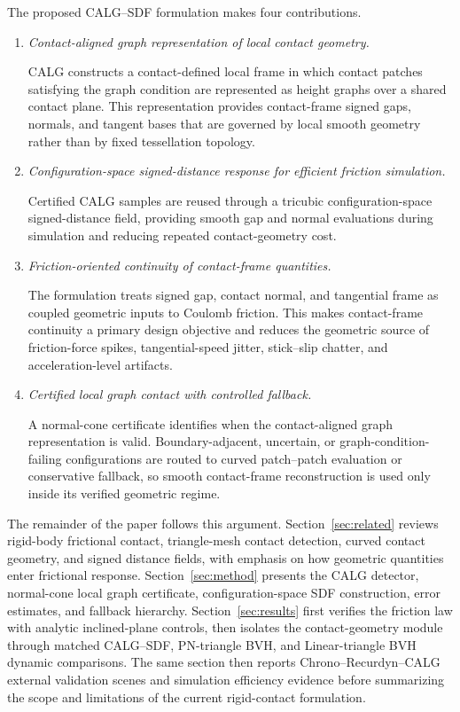 \documentclass[preprint,12pt]{elsarticle}
\newcommand{\calg}{\textsc{CALG}}
\begin{document}
The proposed \calg{}--SDF formulation makes four contributions.
\begin{enumerate}[leftmargin=*,label=(\roman*)]
    \item \emph{Contact-aligned graph representation of local contact geometry.}
    \par \calg{} constructs a contact-defined local frame in which contact patches satisfying the graph condition are represented as height graphs over a shared contact plane. This representation provides contact-frame signed gaps, normals, and tangent bases that are governed by local smooth geometry rather than by fixed tessellation topology.
    \item \emph{Configuration-space signed-distance response for efficient friction simulation.}
    \par Certified \calg{} samples are reused through a tricubic configuration-space signed-distance field, providing smooth gap and normal evaluations during simulation and reducing repeated contact-geometry cost.
    \item \emph{Friction-oriented continuity of contact-frame quantities.}
    \par The formulation treats signed gap, contact normal, and tangential frame as coupled geometric inputs to Coulomb friction. This makes contact-frame continuity a primary design objective and reduces the geometric source of friction-force spikes, tangential-speed jitter, stick--slip chatter, and acceleration-level artifacts.
    \item \emph{Certified local graph contact with controlled fallback.}
    \par A normal-cone certificate identifies when the contact-aligned graph representation is valid. Boundary-adjacent, uncertain, or graph-condition-failing configurations are routed to curved patch--patch evaluation or conservative fallback, so smooth contact-frame reconstruction is used only inside its verified geometric regime.
\end{enumerate}

The remainder of the paper follows this argument. Section~\ref{sec:related} reviews rigid-body frictional contact, triangle-mesh contact detection, curved contact geometry, and signed distance fields, with emphasis on how geometric quantities enter frictional response. Section~\ref{sec:method} presents the \calg{} detector, normal-cone local graph certificate, configuration-space SDF construction, error estimates, and fallback hierarchy. Section~\ref{sec:results} first verifies the friction law with analytic inclined-plane controls, then isolates the contact-geometry module through matched \calg{}--SDF, PN-triangle BVH, and Linear-triangle BVH dynamic comparisons. The same section then reports Chrono--Recurdyn--\calg{} external validation scenes and simulation efficiency evidence before summarizing the scope and limitations of the current rigid-contact formulation.
\end{document}
